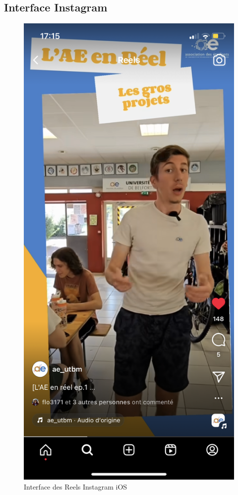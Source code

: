 \subsection*{Interface Instagram}\label{subsec:interface-instagram}

\begin{figure}[!h]
    \begin{center}
        \includegraphics[scale=0.2]{ressources/interfaceInsta}
        \caption{Interface des Reels Instagram iOS \label{fig:interfaceInsta}}
    \end{center}
\end{figure}

